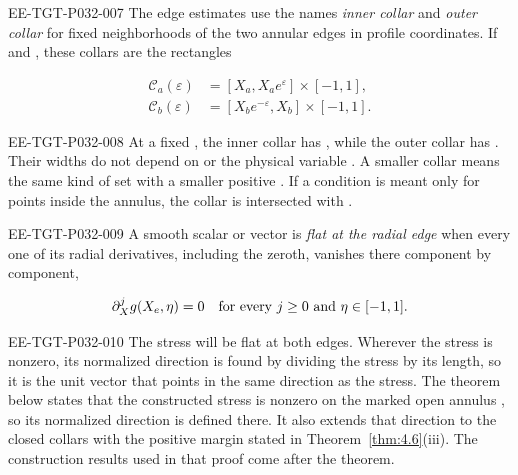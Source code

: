 \begin{EESegment}{EE-TGT-P032-007}
The edge estimates use the names \emph{inner collar} and \emph{outer collar}
for fixed neighborhoods of the two annular edges in profile coordinates. If
 and
, these collars are the
rectangles
\end{EESegment}
\begin{equation}
\begin{aligned}
  \mathcal{C}_a(\varepsilon)&=[X_a,X_ae^\varepsilon]\times[-1,1],\\
  \mathcal{C}_b(\varepsilon)&=[X_be^{-\varepsilon},X_b]\times[-1,1].
\end{aligned}
\tag{4.24}\label{eq:4.24}
\end{equation}
\begin{EESegment}{EE-TGT-P032-008}
At a fixed , the inner collar has
, while the outer collar
has . Their widths do
not depend on  or the physical variable
. A smaller collar means the same kind of set with a
smaller positive . If a condition is meant
only for points inside the annulus, the collar is intersected with
.
\end{EESegment}

\begin{EESegment}{EE-TGT-P032-009}
A smooth scalar or vector  is \emph{flat at the radial
edge}  when every one of its radial
derivatives, including the zeroth, vanishes there component by component,
\end{EESegment}
\[
  \partial_X^jg(X_e,\eta)=0\quad\hbox{for every }j\geq0\hbox{ and }\eta\in[-1,1].
\]
\begin{EESegment}{EE-TGT-P032-010}
The stress will be flat at both edges. Wherever the stress is nonzero, its normalized direction is
found by dividing the stress by its length, so it is the unit vector that points in the same direction
as the stress. The theorem below states that the constructed stress is nonzero on the marked open
annulus , so its normalized direction is defined there. It also
extends that direction to the closed collars with the positive margin stated in
Theorem~\ref{thm:4.6}(iii). The construction results used in that proof come after the theorem.
\end{EESegment}

